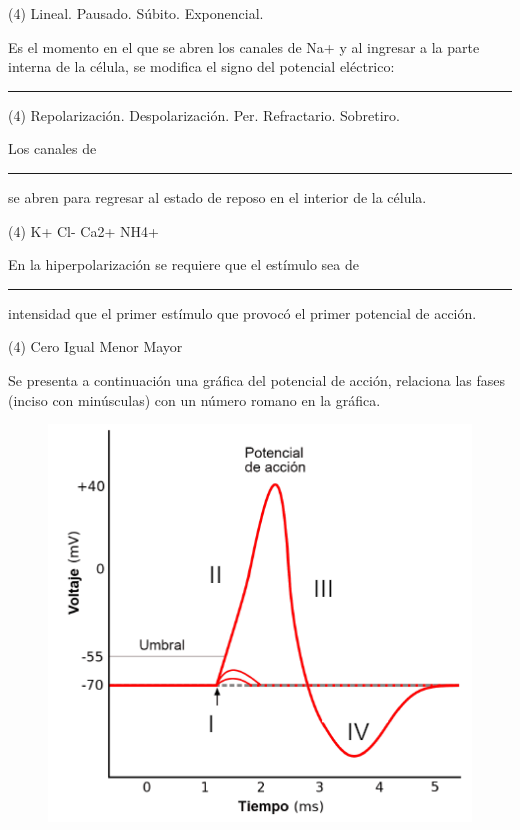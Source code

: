 \documentclass[12pt, letter]{exam}
\begin{document}
\begin{questions}
    \begin{tasks}(4)
        \task Lineal.        
        \task Pausado.        
        \task Súbito.        
        \task Exponencial.        
    \end{tasks}
    \question Es el momento en el que se abren los canales de Na+ y al ingresar a la parte interna de la célula, se modifica el signo del potencial eléctrico: \rule{2cm}{0.1mm}
    \begin{tasks}(4)
        \task Repolarización.
        \task Despolarización.
        \task Per. Refractario.
        \task Sobretiro.
    \end{tasks}
    \question Los canales de \rule{2cm}{0.1mm} se abren para regresar al estado de reposo en el interior de la célula.
    \begin{tasks}(4)
        \task K+
        \task Cl-
        \task Ca2+
        \task NH4+
    \end{tasks}
    \question En la hiperpolarización se requiere que el estímulo sea de \rule{2cm}{0.1mm} intensidad que el primer estímulo que provocó el primer potencial de acción.
    \begin{tasks}(4)
        \task Cero
        \task Igual
        \task Menor
        \task Mayor
    \end{tasks} 

    \newpage

    \question Se presenta a continuación una gráfica del potencial de acción, relaciona las fases (inciso con minúsculas) con un número romano en la gráfica.
    \begin{figure}[H]
        \centering
        \includegraphics[scale=0.75]{Potencial_Accion_07.png}
    \end{figure}


\end{questions}
\end{document}
